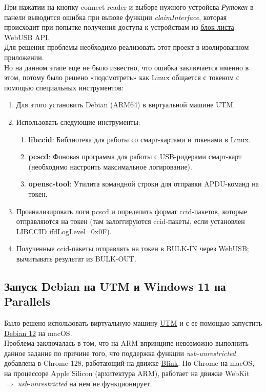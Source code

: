 \documentclass[12pt]{article}
\begin{document}
При нажатии на кнопку connect reader и выборе нужного устройсва \emph{Рутокен} в панели выводится ошибка при вызове функции \emph{claimInterface}, которая происходит при попытке получения доступа к устройствам из \href{https://groups.google.com/a/chromium.org/g/blink-dev/c/LZXocaeCwDw/m/GLfAffGLAAAJ}{{блок-листа}} WebUSB API. \\
Для решения проблемы необходимо реализовать этот проект в изолированном приложении. \\

Но на данном этапе еще не было известно, что ошибка заключается именно в этом, потому было решено «подсмотреть» как Linux общается с токеном с помощью специальных инструментов: \\
\begin{enumerate} 
    \item Для этого установить  Debian  (ARM64)  в  виртуальной машине UTM.
    \item Использовать  следующие  инструменты:
    \begin{enumerate}
 	      \item \textbf{libccid}: Библиотека  для  работы  со  смарт-картами  и  токенами  в  Linux.
     	  \item \textbf{pcscd}: Фоновая программа  для  работы  с  USB-ридерами  смарт-карт  (необходимо  настроить  максимальное  логирование).
     	  \item \textbf{opensc-tool}: Утилита  командной  строки  для  отправки  APDU-команд  на  токен. 
    \end{enumerate}
    \item Проанализировать  логи  pcscd  и  определить  формат  ccid-пакетов,  которые  отправляются  на  токен (там залоггируются ccid-пакеты, если установлен LIBCCID ifdLogLevel=0x0F). 
    \item Полученные ccid-пакеты отправлять на токен в BULK-IN через WebUSB; вычитывать результат из BULK-OUT. 
\end{enumerate} 

\subsection{Запуск Debian на UTM и Windows 11 на Parallels}
Было решено использовать виртуальную машину \href{https://mac.getutm.app}{{UTM}} и с ее помощью запустить \href{https://mac.getutm.app/gallery/debian-12}{{Debian 12}} на macOS. \\
Проблема заключалась в том, что на ARM впринципе невозможно выполнить данное задание по причине того, что поддержка функции \emph{usb-unrestricted} добавлена в Chrome 128, работающий на движке \href{https://www.chromium.org/blink/}{{Blink}}. Но Chrome на macOS, на процессоре Apple Silicon (архитектура ARM), работает на движке WebKit $\Rightarrow$ \emph{usb-unrestricted} на нем не функционирует. 
\end{document}
